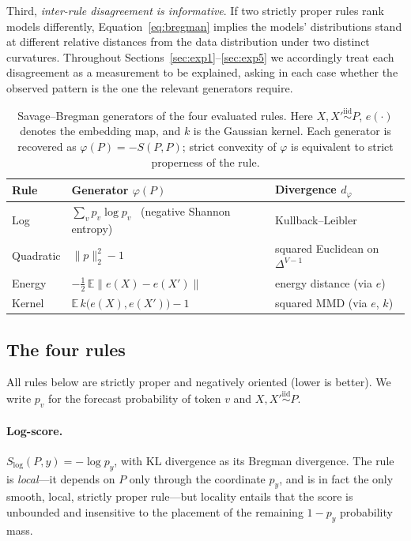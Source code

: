 \documentclass{article}
\newcommand{\Elog}{S_{\mathrm{log}}}
\newcommand{\simplex}{\Delta^{V-1}}
\begin{document}
Third, \emph{inter-rule disagreement is informative}. If two strictly proper rules rank
models differently, Equation~\eqref{eq:bregman} implies the models' distributions stand
at different relative distances from the data distribution under two distinct
curvatures. Throughout Sections~\ref{sec:exp1}--\ref{sec:exp5} we accordingly treat each
disagreement as a measurement to be explained, asking in each case whether the observed
pattern is the one the relevant generators require.

\begin{table}[t]
  \caption{Savage--Bregman generators of the four evaluated rules. Here
  $X, X' \stackrel{\text{iid}}{\sim} P$, $e(\cdot)$ denotes the embedding map, and $k$ is
  the Gaussian kernel. Each generator is recovered as $\varphi(P) = -S(P,P)$; strict
  convexity of $\varphi$ is equivalent to strict properness of the rule.}
  \label{tab:generators}
  \centering
  \small
  \begin{tabular}{lll}
    \toprule
    Rule & Generator $\varphi(P)$ & Divergence $d_\varphi$ \\
    \midrule
    Log        & $\sum_v p_v \log p_v$ \ (negative Shannon entropy) & Kullback--Leibler \\
    Quadratic  & $\lVert p \rVert_2^2 - 1$ & squared Euclidean on $\simplex$ \\
    Energy     & $-\tfrac{1}{2}\,\mathbb{E}\lVert e(X) - e(X')\rVert$ & energy distance (via $e$) \\
    Kernel     & $\mathbb{E}\,k\big(e(X), e(X')\big) - 1$ & squared MMD (via $e$, $k$) \\
    \bottomrule
  \end{tabular}
\end{table}

\subsection{The four rules}
\label{sec:rules}

All rules below are strictly proper and negatively oriented (lower is better). We write
$p_v$ for the forecast probability of token $v$ and $X, X' \stackrel{\text{iid}}{\sim} P$.

\paragraph{Log-score.} $\Elog(P,y) = -\log p_y$, with KL divergence as its Bregman
divergence. The rule is \emph{local}---it depends on $P$ only through the coordinate
$p_y$, and is in fact the only smooth, local, strictly proper rule---but locality
entails that the score is unbounded and insensitive to the placement of the remaining
$1 - p_y$ probability mass.
\end{document}
